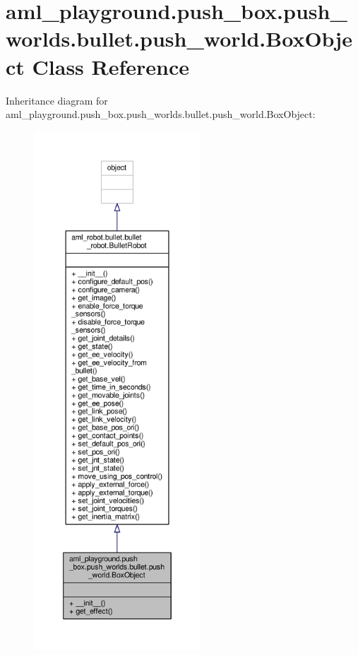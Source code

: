 \hypertarget{classaml__playground_1_1push__box_1_1push__worlds_1_1bullet_1_1push__world_1_1_box_object}{\section{aml\-\_\-playground.\-push\-\_\-box.\-push\-\_\-worlds.\-bullet.\-push\-\_\-world.\-Box\-Object Class Reference}
\label{classaml__playground_1_1push__box_1_1push__worlds_1_1bullet_1_1push__world_1_1_box_object}
}


Inheritance diagram for aml\-\_\-playground.\-push\-\_\-box.\-push\-\_\-worlds.\-bullet.\-push\-\_\-world.\-Box\-Object\-:\nopagebreak
\begin{figure}[H]
\begin{center}
\leavevmode
\includegraphics[height=550pt]{classaml__playground_1_1push__box_1_1push__worlds_1_1bullet_1_1push__world_1_1_box_object__inherit__graph}
\end{center}
\end{figure}


